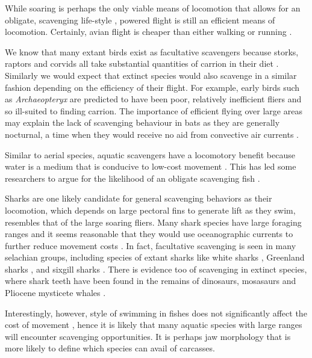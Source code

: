 \documentclass[a4paper,12pt]{article}
\begin{document}
While soaring is perhaps the only viable means of locomotion that allows for an obligate, scavenging life-style \citep{ruxton2004obligate}, powered flight is still an efficient means of locomotion. 
Certainly, avian flight is cheaper than either walking or running \citep{tucker1975energetic}.

We know that many extant birds exist as facultative scavengers because storks, raptors and corvids all take substantial quantities of carrion in their diet \textcolor{blue}{\citep{mateo2015regional}}. 
Similarly we would expect that extinct species would also scavenge in a similar fashion depending on the efficiency of their flight. 
For example, early birds such as \textit{Archaeopteryx} are predicted to have been poor, relatively inefficient fliers \citep{nudds2010narrow} and so ill-suited to finding carrion. 
The importance of efficient flying over large areas may explain the lack of scavenging behaviour in bats as they are generally nocturnal, a time when they would receive no aid from convective air currents \citep{norberg2012vertebrate}. 

Similar to aerial species, aquatic scavengers have a locomotory benefit because water is a medium that is conducive to low-cost movement \citep{tucker1975energetic,williams1999evolution}.
This has led some researchers to argue for the likelihood of an obligate scavenging fish \citep{ruxton2004energetic,ruxton2005searching}. 

Sharks are one likely candidate for general scavenging behaviors as their locomotion, which depends on large pectoral fins to generate lift as they swim, resembles that of the large soaring fliers.
Many shark species have large foraging ranges \citep[e.g. the great white sharks \textit{Carcharodon carcharias};][]{bruce2006movements} and it seems reasonable that they would use oceanographic currents to further reduce movement costs \citep{ruxton2004energetic}.
In fact, facultative scavenging is seen in many selachian groups, including species of extant sharks like white sharks \citep[known to feed on whale carcasses;][]{fallows2013white}, Greenland sharks \citep[feeding on seals;][]{watanabe2012slowest}, and sixgill sharks \citep{anderson2016impact}. 
There is evidence too of scavenging in extinct species, where shark teeth have been found in the remains of dinosaurs, mosasaurs and Pliocene mysticete whales \citep[5.3 - 3.6 Mya; ][]{schwimmer1997scavenging,ehret2009caught}. 

Interestingly, however, style of swimming in fishes does not significantly affect the cost of movement \citep{williams1999evolution}, hence it is likely that many aquatic species with large ranges will encounter scavenging opportunities. 
It is perhaps jaw morphology that is more likely to define which species can avail of carcasses.
\end{document}
